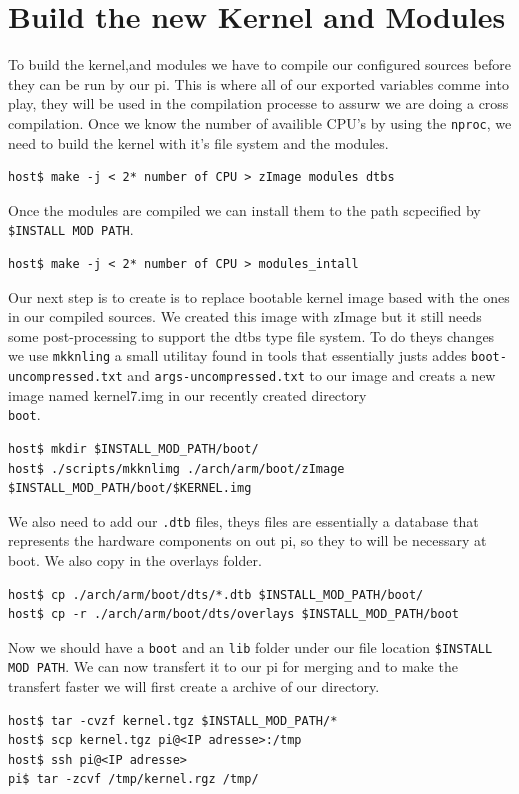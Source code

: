\documentclass[a4paper,oneside,onecolumn]{article}
\newcommand{\code}[1]{\colorbox{codegray}{\texttt{#1}}}
\begin{document}
\newpage
\section{Build the new Kernel and Modules}

To build the kernel,and modules we have to compile our configured sources before they can be run by our pi.  This is where all of our exported variables comme into play, they will be used in the compilation processe to assurw we are doing a cross compilation.\newline
Once we know the number of availible CPU's by using the \code{nproc}, we need to build the kernel with it's file system and the modules.
\begin{lstlisting}
host$ make -j < 2* number of CPU > zImage modules dtbs
\end{lstlisting}
Once the modules are compiled we can install them to the path scpecified by \code{\$INSTALL MOD PATH}.
\begin{lstlisting}
host$ make -j < 2* number of CPU > modules_intall
\end{lstlisting}
Our next step is to create is to replace bootable kernel image based with the ones in our compiled sources. We created this image with zImage but it still needs some post-processing to support the dtbs type file system. To do theys changes we use \code{mkknling} a small utilitay found in tools that essentially justs addes \texttt{boot-uncompressed.txt} and \texttt{args-uncompressed.txt} to our image and creats a new image named kernel7.img in our recently created directory \texttt{\\boot}.
\begin{lstlisting}
host$ mkdir $INSTALL_MOD_PATH/boot/
host$ ./scripts/mkknlimg ./arch/arm/boot/zImage $INSTALL_MOD_PATH/boot/$KERNEL.img
\end{lstlisting}
We also need to add our \code{.dtb} files, theys files are essentially a database that represents the hardware components on out pi, so they to will be necessary at boot. We also copy in the overlays folder.
\begin{lstlisting}
host$ cp ./arch/arm/boot/dts/*.dtb $INSTALL_MOD_PATH/boot/
host$ cp -r ./arch/arm/boot/dts/overlays $INSTALL_MOD_PATH/boot
\end{lstlisting}
Now we should have a \texttt{boot} and an \texttt{lib} folder under our file location \texttt{\$INSTALL MOD PATH}. We can now transfert it to our pi for merging and to make the transfert faster we will first create a archive of our directory.
\begin{lstlisting}
host$ tar -cvzf kernel.tgz $INSTALL_MOD_PATH/*
host$ scp kernel.tgz pi@<IP adresse>:/tmp
host$ ssh pi@<IP adresse>
pi$ tar -zcvf /tmp/kernel.rgz /tmp/
\end{lstlisting}
\end{document}
